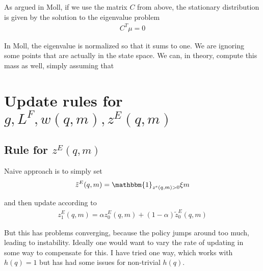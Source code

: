 \documentclass[12pt,english]{article}
\theoremstyle{remark}
\begin{document}
As argued in Moll, if we use the matrix $C$ from above, the stationary distribution is given by the solution to the eigenvalue problem 
\begin{align*}
C^T \mu = 0 
\end{align*}

In Moll, the eigenvalue is normalized so that it sums to one. We are ignoring some points that are actually in the state space. We can, in theory, compute this mass as well, simply assuming that 

\section{Update rules for $g,L^F,w(q,m),z^E(q,m)$}

\subsection{Rule for $z^E(q,m)$}

Naive approach is to simply set 
\begin{align*}
\tilde{z}^E(q,m) = \mathbbm{1}_{z^e(q,m) > 0}\xi m  
\end{align*}

and then update according to 
\begin{align*}
z^E_1(q,m) = \alpha z^E_0(q,m) + (1- \alpha) \tilde{z}^E_0 (q,m) 
\end{align*}
	
But this has problems converging, because the policy jumps around too much, leading to instability. Ideally one would want to vary the rate of updating in some way to compensate for this. I have tried one way, which works with $h(q) = 1$ but has had some issues for non-trivial $h(q)$. 
	
	
	
	
	
	
	
	
\end{document}
